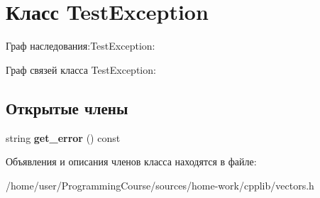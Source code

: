 \hypertarget{classTestException}{\section{Класс Test\+Exception}
\label{classTestException}
}


Граф наследования\+:Test\+Exception\+:


Граф связей класса Test\+Exception\+:
\subsection*{Открытые члены}
\begin{DoxyCompactItemize}
\item 
\hypertarget{classTestException_aac78b6725472d2eabe932fdabe44fae5}{string {\bfseries get\+\_\+error} () const }\label{classTestException_aac78b6725472d2eabe932fdabe44fae5}

\end{DoxyCompactItemize}


Объявления и описания членов класса находятся в файле\+:\begin{DoxyCompactItemize}
\item 
/home/user/\+Programming\+Course/sources/home-\/work/cpplib/vectors.\+h\end{DoxyCompactItemize}
